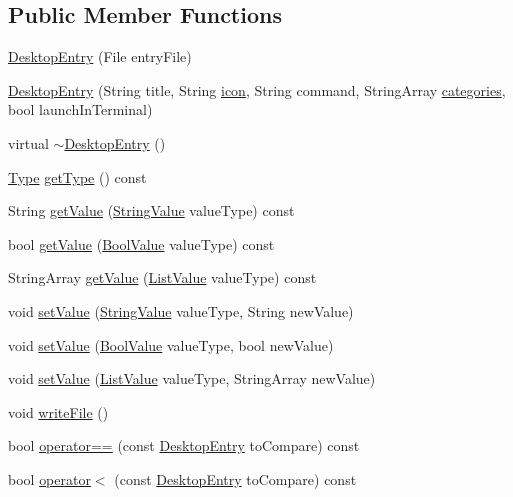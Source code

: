 \subsection*{Public Member Functions}
\begin{DoxyCompactItemize}
\item 
\mbox{\hyperlink{classDesktopEntry_abae72708ecc6c1154efe0b9e8278b240}{Desktop\+Entry}} (File entry\+File)
\item 
\mbox{\hyperlink{classDesktopEntry_ad948445d0022b13a92b21fde2605618c}{Desktop\+Entry}} (String title, String \mbox{\hyperlink{classDesktopEntry_a299e7c10728312fda6daf9ff926e3355ab5bcd9c96c62753a547c32e46bf73472}{icon}}, String command, String\+Array \mbox{\hyperlink{classDesktopEntry_a1b40a3ef9c679a58d3f065d2d183cad0a2a8e1e07217d1eadf1340ea0a53ca054}{categories}}, bool launch\+In\+Terminal)
\item 
virtual \mbox{\hyperlink{classDesktopEntry_a2381339e6c50ba7616568699f0e87f35}{$\sim$\+Desktop\+Entry}} ()
\item 
\mbox{\hyperlink{classDesktopEntry_ae14c5446e35cfe8ecdfb37d0523aa899}{Type}} \mbox{\hyperlink{classDesktopEntry_acfc8f1a763cea3b4918b279c953fc2ed}{get\+Type}} () const
\item 
String \mbox{\hyperlink{classDesktopEntry_a5325bc41e9ccf0b7574974b01c7e110c}{get\+Value}} (\mbox{\hyperlink{classDesktopEntry_a299e7c10728312fda6daf9ff926e3355}{String\+Value}} value\+Type) const
\item 
bool \mbox{\hyperlink{classDesktopEntry_abdd59b33e74462aa82429e3f0a7bec23}{get\+Value}} (\mbox{\hyperlink{classDesktopEntry_ae44a005f0d494b8aeb422ec165517b60}{Bool\+Value}} value\+Type) const
\item 
String\+Array \mbox{\hyperlink{classDesktopEntry_a1c99eacb25e23be574c42f17efdbf7b8}{get\+Value}} (\mbox{\hyperlink{classDesktopEntry_a1b40a3ef9c679a58d3f065d2d183cad0}{List\+Value}} value\+Type) const
\item 
void \mbox{\hyperlink{classDesktopEntry_aa42670fee69fc7256997aafdcfda70d0}{set\+Value}} (\mbox{\hyperlink{classDesktopEntry_a299e7c10728312fda6daf9ff926e3355}{String\+Value}} value\+Type, String new\+Value)
\item 
void \mbox{\hyperlink{classDesktopEntry_abd979bd46d7c4ff297bd8a78a90430ba}{set\+Value}} (\mbox{\hyperlink{classDesktopEntry_ae44a005f0d494b8aeb422ec165517b60}{Bool\+Value}} value\+Type, bool new\+Value)
\item 
void \mbox{\hyperlink{classDesktopEntry_a4e3922949b91b3c3944d8c70b2250634}{set\+Value}} (\mbox{\hyperlink{classDesktopEntry_a1b40a3ef9c679a58d3f065d2d183cad0}{List\+Value}} value\+Type, String\+Array new\+Value)
\item 
void \mbox{\hyperlink{classDesktopEntry_acad61220143a4b154ad4a79b9ae158e8}{write\+File}} ()
\item 
bool \mbox{\hyperlink{classDesktopEntry_a07661602b5612e069746f59369522bdc}{operator==}} (const \mbox{\hyperlink{classDesktopEntry}{Desktop\+Entry}} to\+Compare) const
\item 
bool \mbox{\hyperlink{classDesktopEntry_a8d3abfb2d5c26d76ab9c5eb4fab21c15}{operator$<$}} (const \mbox{\hyperlink{classDesktopEntry}{Desktop\+Entry}} to\+Compare) const
\end{DoxyCompactItemize}



